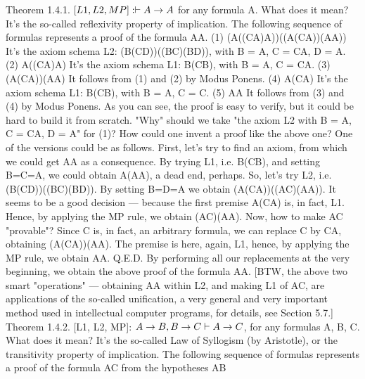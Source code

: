 Theorem 1.4.1. \([L1, L2, MP]: \vdash A\rightarrow A\) for any formula A. What does it mean? It's the so-called
reflexivity property of implication.
The following sequence of formulas represents a proof of the formula A\IMPLIES A.
(1) (A\IMPLIES ((C\IMPLIES A)\IMPLIES A))\IMPLIES ((A\IMPLIES (C\IMPLIES A))\IMPLIES (A\IMPLIES A)) It's the axiom schema L2: (B\IMPLIES (C\IMPLIES D))\IMPLIES ((B\IMPLIES C)\IMPLIES (B\IMPLIES D)), with B = A, C = C\IMPLIES A, D = A.  (2) A\IMPLIES ((C\IMPLIES A)\IMPLIES A) It's the axiom schema L1: B\IMPLIES (C\IMPLIES B), with B = A, C = C\IMPLIES A.  (3) (A\IMPLIES (C\IMPLIES A))\IMPLIES (A\IMPLIES A) It follows from (1) and (2) by Modus Ponens.  (4) A\IMPLIES (C\IMPLIES A) It's the axiom schema L1: B\IMPLIES (C\IMPLIES B), with B = A, C = C.  (5) A\IMPLIES A It follows from (3) and (4) by Modus Ponens.
As you can see, the proof is easy to verify, but it could be hard to build it from scratch. "Why" should we
take "the axiom L2 with B = A, C = C\IMPLIES A, D = A" for (1)?
How could one invent a proof like the above one? One of the versions could be as follows. First, let's try to find an axiom,
from which we could get A\IMPLIES A as a consequence. By trying L1, i.e. B\IMPLIES (C\IMPLIES B), and setting B=C=A, we could obtain
A\IMPLIES (A\IMPLIES A), a dead end, perhaps. So, let's try L2, i.e. (B\IMPLIES (C\IMPLIES D))\IMPLIES ((B\IMPLIES C)\IMPLIES (B\IMPLIES D)). By setting B=D=A we obtain
(A\IMPLIES (C\IMPLIES A))\IMPLIES ((A\IMPLIES C)\IMPLIES (A\IMPLIES A)). It seems to be a good decision --- because the first premise A\IMPLIES (C\IMPLIES A) is, in fact, L1.
Hence, by applying the MP rule, we obtain (A\IMPLIES C)\IMPLIES (A\IMPLIES A). Now, how to make A\IMPLIES C "provable"? Since C is, in fact, an
arbitrary formula, we can replace C by C\IMPLIES A, obtaining (A\IMPLIES (C\IMPLIES A))\IMPLIES (A\IMPLIES A). The premise is here, again, L1, hence, by
applying the MP rule, we obtain A\IMPLIES A. Q.E.D. By performing all our replacements at the very beginning, we obtain the above
proof of the formula A\IMPLIES A. [BTW, the above two smart "operations" --- obtaining A\IMPLIES A within L2, and making L1 of A\IMPLIES C,
are applications of the so-called unification, a very general and very important method used in intellectual computer programs,
for details, see Section 5.7.]
Theorem 1.4.2. [L1, L2, MP]: \(A\rightarrow B, B\rightarrow C \vdash A\rightarrow C\), for any formulas A, B, C. What does it mean? It's
the so-called Law of Syllogism (by Aristotle), or the transitivity property of implication.
The following sequence of formulas represents a proof of the formula A\IMPLIES C from the hypotheses A\IMPLIES B
